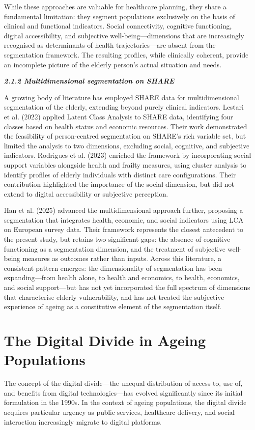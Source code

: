 While these approaches are valuable for healthcare planning, they share a fundamental limitation: they segment populations exclusively on the basis of clinical and functional indicators. Social connectivity, cognitive functioning, digital accessibility, and subjective well-being---dimensions that are increasingly recognised as determinants of health trajectories---are absent from the segmentation framework. The resulting profiles, while clinically coherent, provide an incomplete picture of the elderly person's actual situation and needs.

\emph{\textbf{2.1.2 Multidimensional segmentation on SHARE}}

A growing body of literature has employed SHARE data for multidimensional segmentation of the elderly, extending beyond purely clinical indicators. Lestari et al. (2022) applied Latent Class Analysis to SHARE data, identifying four classes based on health status and economic resources. Their work demonstrated the feasibility of person-centred segmentation on SHARE's rich variable set, but limited the analysis to two dimensions, excluding social, cognitive, and subjective indicators. Rodrigues et al. (2023) enriched the framework by incorporating social support variables alongside health and frailty measures, using cluster analysis to identify profiles of elderly individuals with distinct care configurations. Their contribution highlighted the importance of the social dimension, but did not extend to digital accessibility or subjective perception.

Han et al. (2025) advanced the multidimensional approach further, proposing a segmentation that integrates health, economic, and social indicators using LCA on European survey data. Their framework represents the closest antecedent to the present study, but retains two significant gaps: the absence of cognitive functioning as a segmentation dimension, and the treatment of subjective well-being measures as outcomes rather than inputs. Across this literature, a consistent pattern emerges: the dimensionality of segmentation has been expanding---from health alone, to health and economics, to health, economics, and social support---but has not yet incorporated the full spectrum of dimensions that characterise elderly vulnerability, and has not treated the subjective experience of ageing as a constitutive element of the segmentation itself.

\section{The Digital Divide in Ageing Populations}
The concept of the digital divide---the unequal distribution of access to, use of, and benefits from digital technologies---has evolved significantly since its initial formulation in the 1990s. In the context of ageing populations, the digital divide acquires particular urgency as public services, healthcare delivery, and social interaction increasingly migrate to digital platforms.


